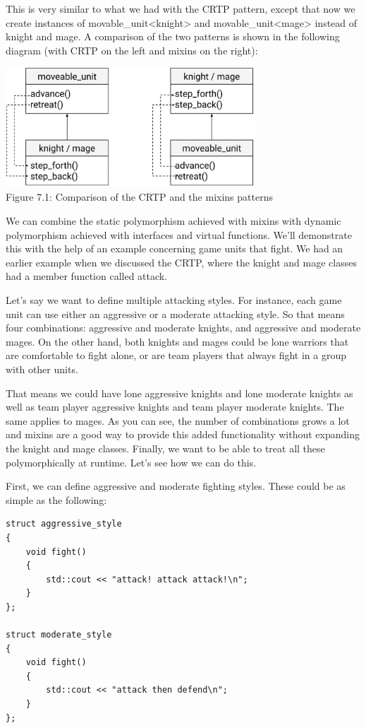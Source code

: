 This is very similar to what we had with the CRTP pattern, except that now we create instances of movable\_unit<knight> and movable\_unit<mage> instead of knight and mage. A comparison of the two patterns is shown in the following diagram (with CRTP on the left and mixins on the right):

\begin{center}
\includegraphics[width=0.7\textwidth]{content/3/chapter7/images/1.png}\\
Figure 7.1: Comparison of the CRTP and the mixins patterns
\end{center}

We can combine the static polymorphism achieved with mixins with dynamic polymorphism achieved with interfaces and virtual functions. We’ll demonstrate this with the help of an example concerning game units that fight. We had an earlier example when we discussed the CRTP, where the knight and mage classes had a member function called attack.

Let’s say we want to define multiple attacking styles. For instance, each game unit can use either an aggressive or a moderate attacking style. So that means four combinations: aggressive and moderate knights, and aggressive and moderate mages. On the other hand, both knights and mages could be lone warriors that are comfortable to fight alone, or are team players that always fight in a group with other units.

That means we could have lone aggressive knights and lone moderate knights as well as team player aggressive knights and team player moderate knights. The same applies to mages. As you can see, the number of combinations grows a lot and mixins are a good way to provide this added functionality without expanding the knight and mage classes. Finally, we want to be able to treat all these polymorphically at runtime. Let’s see how we can do this.

First, we can define aggressive and moderate fighting styles. These could be as simple as the following:

\begin{lstlisting}[style=styleCXX]
struct aggressive_style
{
	void fight()
	{
		std::cout << "attack! attack attack!\n";
	}
};

struct moderate_style
{
	void fight()
	{
		std::cout << "attack then defend\n";
	}
};
\end{lstlisting}

